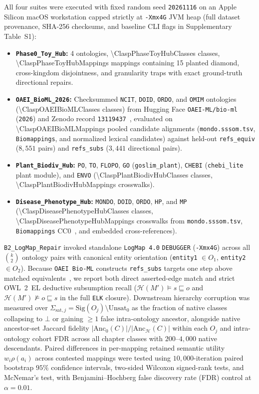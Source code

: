 \documentclass[10pt]{article}
\theoremstyle{accentdef}
\begin{document}
All four suites were executed with fixed random seed \texttt{20261116} on an Apple Silicon macOS workstation capped strictly at \texttt{-Xmx4G} JVM heap (full dataset provenance, SHA-256 checksums, and baseline CLI flags in Supplementary Table~S1):
\begin{itemize}
  \item \textbf{\texttt{Phase0\_Toy\_Hub}:} 4 ontologies, \num{\ClaspPhaseToyHubClasses} classes, \num{\ClaspPhaseToyHubMappings} mappings containing 15 planted diamond, cross-kingdom disjointness, and granularity traps with exact ground-truth directional repairs.
  \item \textbf{\texttt{OAEI\_BioML\_2026}:} Checksummed \texttt{NCIT}, \texttt{DOID}, \texttt{ORDO}, and \texttt{OMIM} ontologies (\num{\ClaspOAEIBioMLClasses} classes) from Hugging Face \texttt{OAEI-ML/bio-ml} (\texttt{2026}) and Zenodo record \texttt{13119437}~\cite{he2022bioml}, evaluated on \num{\ClaspOAEIBioMLMappings} pooled candidate alignments (\texttt{mondo.sssom.tsv}, \texttt{Biomappings}, and normalized lexical candidates) against held-out \texttt{refs\_equiv} ($8{,}551$ pairs) and \texttt{refs\_subs} ($3{,}441$ directional pairs).
  \item \textbf{\texttt{Plant\_Biodiv\_Hub}:} \texttt{PO}, \texttt{TO}, \texttt{FLOPO}, \texttt{GO} (\texttt{goslim\_plant}), \texttt{CHEBI} (\texttt{chebi\_lite} plant module), and \texttt{ENVO} (\num{\ClaspPlantBiodivHubClasses} classes, \num{\ClaspPlantBiodivHubMappings} crosswalks).
  \item \textbf{\texttt{Disease\_Phenotype\_Hub}:} \texttt{MONDO}, \texttt{DOID}, \texttt{ORDO}, \texttt{HP}, and \texttt{MP} (\num{\ClaspDiseasePhenotypeHubClasses} classes, \num{\ClaspDiseasePhenotypeHubMappings} crosswalks from \texttt{mondo.sssom.tsv}, \texttt{Biomappings} CC0~\cite{hoyt2023biomappings}, and embedded cross-references).
\end{itemize}
\texttt{B2\_LogMap\_Repair} invoked standalone \texttt{LogMap~4.0} \texttt{DEBUGGER} (\texttt{-Xmx4G}) across all $\binom{k}{2}$ ontology pairs with canonical entity orientation (\texttt{entity1} $\in O_1$, \texttt{entity2} $\in O_2$). Because \texttt{OAEI Bio-ML} constructs \texttt{refs\_subs} targets one step above matched equivalents~\cite{he2022bioml}, we report both direct asserted-edge match and strict OWL~2~EL deductive subsumption recall ($\mathcal{H}(M') \models s \sqsubseteq o$ and $\mathcal{H}(M') \not\models o \sqsubseteq s$ in the full \texttt{ELK} closure). Downstream hierarchy corruption was measured over $\Sigma_{\mathrm{sat},j} = \mathrm{Sig}(O_j) \setminus \mathrm{Unsat}_0$ as the fraction of native classes collapsing to $\bot$ or gaining $\ge 1$ false intra-ontology ancestor, alongside native ancestor-set Jaccard fidelity $|\mathrm{Anc}_0(C)| / |\mathrm{Anc}_{\mathcal{H}}(C)|$ within each $O_j$ and intra-ontology cohort FDR across all chapter classes with $200\text{--}4{,}000$ native descendants. Paired differences in per-mapping retained semantic utility $w_i \rho(a_i)$ across contested mappings were tested using $10{,}000$-iteration paired bootstrap $95\%$ confidence intervals, two-sided Wilcoxon signed-rank tests, and McNemar's test, with Benjamini--Hochberg false discovery rate (FDR) control at $\alpha = 0.01$.
\end{document}
